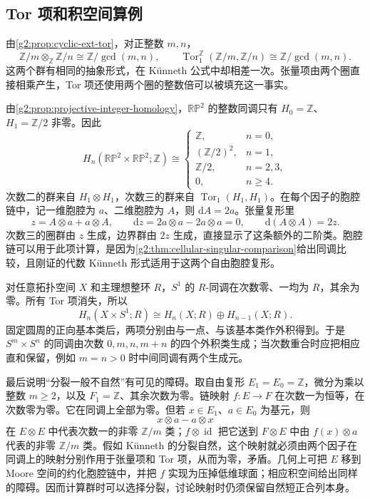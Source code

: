 \subsection{Tor 项和积空间算例}
\label{g2:subsec:0403:04}

由\cref{g2:prop:cyclic-ext-tor}，对正整数 \(m,n\)，
\[
	\mathbb Z/m\otimes_{\mathbb Z}\mathbb Z/n
	\cong\mathbb Z/\gcd(m,n),
	\qquad
	\operatorname{Tor}_1^{\mathbb Z}(\mathbb Z/m,\mathbb Z/n)
	\cong\mathbb Z/\gcd(m,n).
\]
这两个群有相同的抽象形式，在 Künneth 公式中却相差一次。张量项由两个圈直接相乘产生，Tor 项还使用两个圈的整数倍可以被填充这一事实。

\begin{example}\label{g2:exm:RP2-product-torsion}
	由\cref{g2:prop:projective-integer-homology}，\(\mathbb{RP}^2\) 的整数同调只有 \(H_0=\mathbb Z\)、\(H_1=\mathbb Z/2\) 非零。因此
	\[
		H_n(\mathbb{RP}^2\times\mathbb{RP}^2;\mathbb Z)
		\cong
		\begin{cases}
			\mathbb Z,&n=0,\\
			(\mathbb Z/2)^2,&n=1,\\
			\mathbb Z/2,&n=2,3,\\
			0,&n\ge4.
		\end{cases}
	\]
	次数二的群来自 \(H_1\otimes H_1\)，次数三的群来自 \(\operatorname{Tor}_1(H_1,H_1)\)。在每个因子的胞腔链中，记一维胞腔为 \(a\)、二维胞腔为 \(A\)，则 \(\mathrm{d}A=2a\)。张量复形里
	\[
		z=A\otimes a+a\otimes A,\qquad
		\mathrm{d}z=2a\otimes a-2a\otimes a=0,
		\qquad
		\mathrm{d}(A\otimes A)=2z.
	\]
	次数三的圈群由 \(z\) 生成，边界群由 \(2z\) 生成，直接显示了这条额外的二阶类。胞腔链可以用于此项计算，是因为\cref{g2:thm:cellular-singular-comparison}给出同调比较，且刚证的代数 Künneth 形式适用于这两个自由胞腔复形。
\end{example}

\begin{example}\label{g2:exm:circle-product-homology}
	对任意拓扑空间 \(X\) 和主理想整环 \(R\)，\(S^1\) 的 \(R\)-同调在次数零、一均为 \(R\)，其余为零。所有 Tor 项消失，所以
	\[
		H_n(X\times S^1;R)
		\cong H_n(X;R)\oplus H_{n-1}(X;R).
	\]
	固定圆周的正向基本类后，两项分别由与一点、与该基本类作外积得到。于是 \(S^m\times S^n\) 的同调由次数 \(0,m,n,m+n\) 的四个外积类生成；当次数重合时应把相应直和保留，例如 \(m=n>0\) 时中间同调有两个生成元。
\end{example}

最后说明“分裂一般不自然”有可见的障碍。取自由复形 \(E_1=E_0=\mathbb Z\)，微分为乘以整数 \(m\ge2\)，以及 \(F_1=\mathbb Z\)、其余次数为零。链映射 \(f:E\to F\) 在次数一为恒等，在次数零为零。它在同调上全部为零。但若 \(x\in E_1\)、\(a\in E_0\) 为基元，则
\[
	x\otimes a-a\otimes x
\]
在 \(E\otimes E\) 中代表次数一的非零 \(\mathbb Z/m\) 类；\(f\otimes\operatorname{id}\) 把它送到 \(F\otimes E\) 中由 \(f(x)\otimes a\) 代表的非零 \(\mathbb Z/m\) 类。假如 Künneth 的分裂自然，这个映射就必须由两个因子在同调上的映射分别作用于张量项和 Tor 项，从而为零，矛盾。几何上可把 \(E\) 移到 Moore 空间的约化胞腔链中，并把 \(f\) 实现为压掉低维球面；相应积空间给出同样的障碍。因而计算群时可以选择分裂，讨论映射时仍须保留自然短正合列本身。
